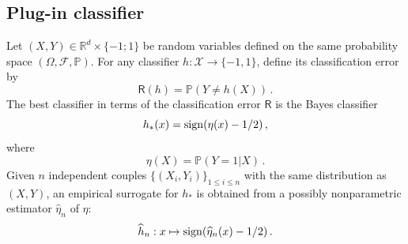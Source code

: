 \documentclass[a4paper,10pt,fleqn]{article}
\newcommand{\eqsp}{\,}
\newcommand{\calF}{\mathcal{F}}
\newcommand{\rset}{\ensuremath{\mathbb{R}}}
\newcommand{\bP}{\mathbb{P}}
\newcommand{\1}{\ensuremath{\mathbbm{1}}}
\begin{document}
\subsection{Plug-in classifier}
Let $(X,Y)\in\rset^d\times\{-1;1\}$ be random variables defined on the same probability space $(\Omega,\calF,\bP)$.
For any classifier $h:\mathcal{X}\to \{-1,1\}$, define its classification error by
$$
\mathsf{R}(h)=\bP(Y\neq h(X))\eqsp.
$$
The best classifier in terms of the classification error $\mathsf{R}$ is the Bayes classifier
$$
h_{*}(x)={\rm sign}(\eta(x)-1/2)\eqsp,
$$
where
$$
\eta(X) = \bP(Y=1|X)\eqsp.
$$
Given $n$ independent couples $\{(X_i,Y_i)\}_{1\leqslant i \leqslant n}$ with the same distribution as $(X,Y)$, an empirical surrogate for $h_{*}$ is obtained from a possibly nonparametric estimator $\widehat \eta_n$ of $\eta$:
$$
\widehat h_n: x\mapsto {\rm sign}(\widehat \eta_n(x)-1/2)\eqsp.
$$
\end{document}

